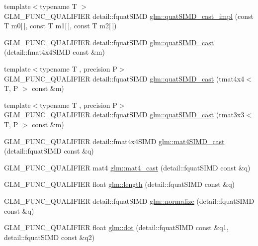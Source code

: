 \begin{DoxyCompactItemize}
\item 
{\footnotesize template$<$typename T $>$ }\\G\+L\+M\+\_\+\+F\+U\+N\+C\+\_\+\+Q\+U\+A\+L\+I\+F\+I\+E\+R detail\+::fquat\+S\+I\+M\+D \hyperlink{namespaceglm_a2e2bb4244525831b56079cdacc87948d}{glm\+::quat\+S\+I\+M\+D\+\_\+cast\+\_\+impl} (const T m0\mbox{[}$\,$\mbox{]}, const T m1\mbox{[}$\,$\mbox{]}, const T m2\mbox{[}$\,$\mbox{]})
\item 
G\+L\+M\+\_\+\+F\+U\+N\+C\+\_\+\+Q\+U\+A\+L\+I\+F\+I\+E\+R detail\+::fquat\+S\+I\+M\+D \hyperlink{namespaceglm_a0c09f4c773ffd14c3d9246a50011cf0c}{glm\+::quat\+S\+I\+M\+D\+\_\+cast} (detail\+::fmat4x4\+S\+I\+M\+D const \&m)
\item 
{\footnotesize template$<$typename T , precision P$>$ }\\G\+L\+M\+\_\+\+F\+U\+N\+C\+\_\+\+Q\+U\+A\+L\+I\+F\+I\+E\+R detail\+::fquat\+S\+I\+M\+D \hyperlink{namespaceglm_a69b23f5cf01145b981cfb276c15813bb}{glm\+::quat\+S\+I\+M\+D\+\_\+cast} (tmat4x4$<$ T, P $>$ const \&m)
\item 
{\footnotesize template$<$typename T , precision P$>$ }\\G\+L\+M\+\_\+\+F\+U\+N\+C\+\_\+\+Q\+U\+A\+L\+I\+F\+I\+E\+R detail\+::fquat\+S\+I\+M\+D \hyperlink{namespaceglm_a7c78cc8051cf7df0760b2ba061a9f48a}{glm\+::quat\+S\+I\+M\+D\+\_\+cast} (tmat3x3$<$ T, P $>$ const \&m)
\item 
G\+L\+M\+\_\+\+F\+U\+N\+C\+\_\+\+Q\+U\+A\+L\+I\+F\+I\+E\+R detail\+::fmat4x4\+S\+I\+M\+D \hyperlink{namespaceglm_a0b2e5499072a338c1256735ecbf363ff}{glm\+::mat4\+S\+I\+M\+D\+\_\+cast} (detail\+::fquat\+S\+I\+M\+D const \&q)
\item 
G\+L\+M\+\_\+\+F\+U\+N\+C\+\_\+\+Q\+U\+A\+L\+I\+F\+I\+E\+R mat4 \hyperlink{namespaceglm_a350adcfec63eb015dd2d9ee14a4e8cde}{glm\+::mat4\+\_\+cast} (detail\+::fquat\+S\+I\+M\+D const \&q)
\item 
G\+L\+M\+\_\+\+F\+U\+N\+C\+\_\+\+Q\+U\+A\+L\+I\+F\+I\+E\+R float \hyperlink{namespaceglm_aaa8b73fac4aaa2acdfc98adc48cd15d0}{glm\+::length} (detail\+::fquat\+S\+I\+M\+D const \&q)
\item 
G\+L\+M\+\_\+\+F\+U\+N\+C\+\_\+\+Q\+U\+A\+L\+I\+F\+I\+E\+R detail\+::fquat\+S\+I\+M\+D \hyperlink{namespaceglm_a31e71acc931a3619a3305958048cfa8d}{glm\+::normalize} (detail\+::fquat\+S\+I\+M\+D const \&q)
\item 
G\+L\+M\+\_\+\+F\+U\+N\+C\+\_\+\+Q\+U\+A\+L\+I\+F\+I\+E\+R float \hyperlink{namespaceglm_ab68375a7ad5f9dc3db97323af1326bbb}{glm\+::dot} (detail\+::fquat\+S\+I\+M\+D const \&q1, detail\+::fquat\+S\+I\+M\+D const \&q2)

\end{DoxyCompactItemize}
